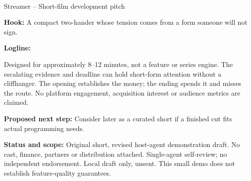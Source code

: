 \documentclass[11pt,letterpaper]{article}
\begin{document}
\begin{center}
{\Large\bfseries\sffamily \filmtitleupper}\\[6pt]
Streamer -- Short-film development pitch
\end{center}
\textbf{Hook:} A compact two-hander whose tension comes from a form someone will not sign.

\textbf{Logline:} \filmlogline

Designed for approximately 8–12 minutes, not a feature or series engine. The escalating evidence and deadline can hold short-form attention without a cliffhanger. The opening establishes the money; the ending spends it and misses the route. No platform engagement, acquisition interest or audience metrics are claimed.

\textbf{Proposed next step:} Consider later as a curated short if a finished cut fits actual programming needs.

\textbf{Status and scope:} Original short, revised host-agent demonstration draft. No cast, finance, partners or distribution attached. Single-agent self-review; no independent endorsement. Local draft only, unsent. This small demo does not establish feature-quality guarantees.
\end{document}
